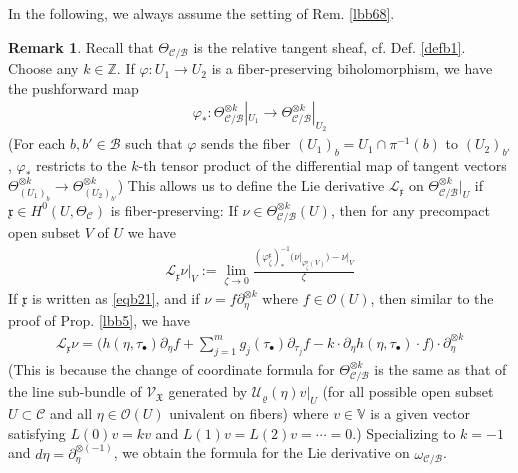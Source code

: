 \documentclass[11pt,b5paper,notitlepage]{article}
\theoremstyle{definition}
\newtheorem{rem}[df]{Remark}
\theoremstyle{plain}
\newcommand{\fk}{\mathfrak}
\newcommand{\mc}{\mathcal}
\newcommand{\scr}{\mathscr}
\newcommand{\xk}{\mathfrak x}
\newcommand{\blt}{\bullet}
\newcommand{\Vbb}{\mathbb V}
\newcommand{\Cbb}{\mathbb C}
\newcommand{\Zbb}{\mathbb Z}
\newcommand{\<}{\left\langle}
\renewcommand{\>}{\right\rangle}
\newcommand{\MC}{\mathcal{C}}
\newcommand{\MB}{\mathcal{B}}
\newcommand{\fx}{\mathfrak{X}}
\numberwithin{equation}{subsection}
\begin{document}
In the following, we always assume the setting of Rem. \ref{lbb68}.

\begin{rem}\label{lbb6}
Recall that $\Theta_{\MC/\MB}$ is the relative tangent sheaf, cf. Def. \ref{defb1}. Choose any $k\in\Zbb$. If $\varphi:U_1\rightarrow U_2$ is a fiber-preserving biholomorphism, we have the pushforward map
\begin{align*}
\varphi_*:\Theta_{\mc C/\mc B}^{\otimes k}|_{U_1}\rightarrow\Theta_{\mc C/\mc B}^{\otimes k}|_{U_2}
\end{align*}
(For each $b,b'\in\mc B$ such that $\varphi$ sends the fiber $(U_1)_b=U_1\cap \pi^{-1}(b)$ to $(U_2)_{b'}$, $\varphi_*$ restricts to the $k$-th tensor product of the differential map of tangent vectors  $\Theta_{(U_1)_b}^{\otimes k}\rightarrow\Theta^{\otimes k}_{(U_2)_{b'}}$) This allows us to define the Lie derivative $\mc L_\xk$ on $\Theta^{\otimes k}_{\mc C/\mc B}|_U$ if $\xk\in H^0(U,\Theta_\MC)$ is fiber-preserving: If $\nu\in \Theta^{\otimes k}_{\mc C/\mc B}(U)$, then for any precompact open subset $V$ of $U$ we have
\begin{align*}
\mc L_\xk\nu|_V:=\lim_{\zeta\rightarrow 0} \frac{(\varphi^\xk_\zeta)_*^{-1}\big(\nu\vert_{\varphi_\zeta^\xk(V)}\big)-\nu\vert_V}{\zeta}
\end{align*}
If $\xk$ is written as \eqref{eqb21}, and if $\nu=f \partial_\eta^{\otimes k}$ where $f\in\mc O(U)$, then similar to the proof of Prop. \ref{lbb5}, we have
\begin{align}\label{eqb42}
\mc L_\xk\nu=\Big(h(\eta,\tau_\blt)\partial_\eta f+\sum_{j=1}^m g_j(\tau_\blt)\partial_{\tau_j}f-k\cdot \partial_\eta h(\eta,\tau_\blt)\cdot f\Big)\cdot \partial_\eta^{\otimes k}
\end{align}
(This is because the change of coordinate formula for $\Theta_{\mc C/\mc B}^{\otimes k}$ is the same as that of the line sub-bundle of $\scr V_\fx$ generated by $\mc U_\varrho(\eta)v\big|_U$ (for all possible open subset $U\subset\mc C$ and all $\eta\in\mc O(U)$ univalent on fibers) where $v\in\Vbb$ is a given vector satisfying $L(0)v=kv$ and $L(1)v=L(2)v=\cdots=0$.)
Specializing to $k=-1$ and $d\eta=\partial_\eta^{\otimes(-1)}$, we obtain the formula for the Lie derivative on $\omega_{\mc C/\mc B}$.
\end{rem}
\end{document}
